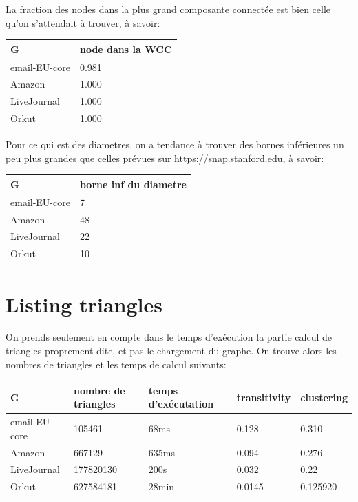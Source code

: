 \documentclass{report}
\begin{document}
La fraction des nodes dans la plus grand composante connectée est bien celle qu'on s'attendait à trouver, à savoir:
\begin{center}
  \begin{tabular}{|l|l|}
    \hline
    G & node dans la WCC \\
    \hline
    email-EU-core & 0.981\\
    Amazon & 1.000\\
    LiveJournal & 1.000\\
    Orkut & 1.000\\
    \hline
  \end{tabular}
\end{center}

Pour ce qui est des diametres, on a tendance à trouver des bornes inférieures un peu plus grandes que celles prévues sur \url{https://snap.stanford.edu}, à savoir:
\begin{center}
  \begin{tabular}{|l|l|}
    \hline
    G & borne inf du diametre \\
    \hline
    email-EU-core & 7\\
    Amazon & 48\\
    LiveJournal & 22\\
    Orkut & 10\\
    \hline
  \end{tabular}
\end{center}

\section{Listing triangles}
On prends seulement en compte dans le temps d'exécution la partie calcul de triangles proprement dite, et pas le chargement du graphe. On trouve alors les nombres de triangles et les temps de calcul suivants:\\
\begin{center}
  \begin{tabular}{|l|l|l|l|l|}
    \hline
    G & nombre de triangles & temps d'exécutation & transitivity & clustering\\
    \hline
    email-EU-core & 105461 & 68ms & 0.128 & 0.310\\
    Amazon & 667129 & 635ms & 0.094 & 0.276\\
    LiveJournal & 177820130 & 200s & 0.032 & 0.22\\
    Orkut & 627584181 & 28min & 0.0145 & 0.125920\\
    \hline
  \end{tabular}
\end{center}
\end{document}

